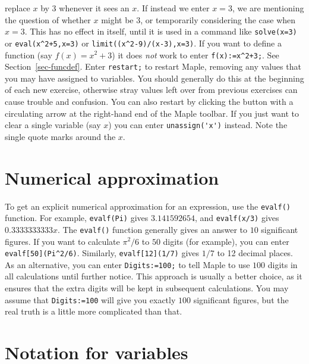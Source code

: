 \documentclass{amsart}
\begin{document}
\begin{itemize}
 replace $x$ by $3$ whenever it sees an $x$.  If instead we
 enter $x=3$, we are mentioning the question of whether $x$
 might be $3$, or temporarily considering the case when
 $x=3$.  This has no effect in itself, until it is used in a
 command like \verb~solve(x=3)~ or \verb~eval(x^2+5,x=3)~
 or \verb~limit((x^2-9)/(x-3),x=3)~. 
%
 If you want to define a function (say $f(x)=x^2+3$) it does
 \emph{not} work to enter \verb~f(x):=x^2+3;~.  See
 Section~\ref{sec-funcdef}. 
%
  Enter \verb~restart;~ to restart Maple, removing any values
  that you may have assigned to variables.  You should
  generally do this at the beginning of each new exercise,
  otherwise stray values left over from previous exercises
  can cause trouble and confusion.  You can also restart by
  clicking the button with a circulating arrow at the
  right-hand end of the Maple toolbar. 
%
  If you just want to clear a single variable (say $x$) you
  can enter \verb~unassign('x')~ instead.  Note the single
  quote marks around the $x$. 
\end{itemize}

\section{Numerical approximation}
\setcounter{notecounter}{0}

\begin{itemize}
  To get an explicit numerical approximation for an
  expression, use the \verb~evalf()~ function.  For example,
  \verb~evalf(Pi)~ gives $3.141592654$, and
  \verb~evalf(x/3)~ gives $0.3333333333 x$. 
%
  The \verb~evalf()~ function generally gives an
  answer to $10$ significant figures.  If you want to
  calculate $\pi^2/6$ to $50$ digits (for example), you can
  enter \verb~evalf[50](Pi^2/6)~.  Similarly,
  \verb~evalf[12](1/7)~ gives $1/7$ to 12 decimal places. 
%
  As an alternative, you can enter
   \verb~Digits:=100;~ to tell Maple to use $100$ digits in
   all calculations until further notice.  This approach is
   usually a better choice, as it ensures that the extra
   digits will be kept in subsequent calculations.  You may
   assume that \verb~Digits:=100~ will give you exactly
   $100$ significant figures, but the real truth is a little
   more complicated than that. 
\end{itemize}

\section{Notation for variables}
\setcounter{notecounter}{0}
\end{document}
